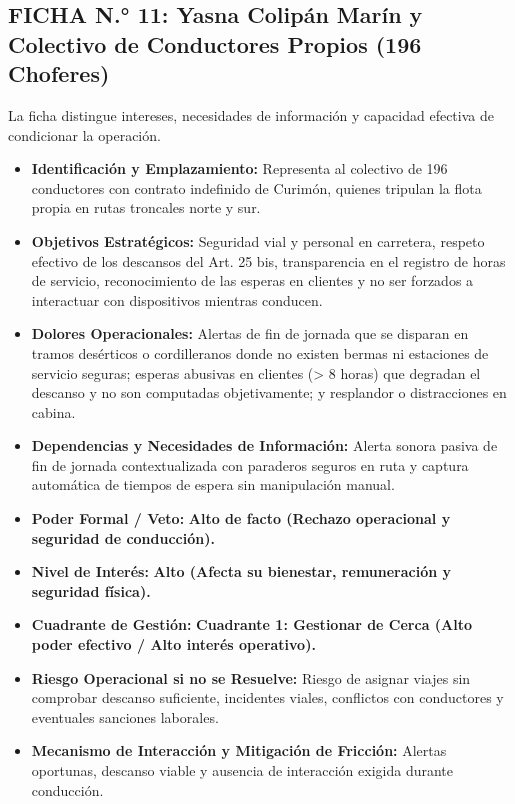 \subsection*{FICHA N.° 11: Yasna Colipán Marín y Colectivo de Conductores Propios (196 Choferes)}
La ficha distingue intereses, necesidades de información y capacidad efectiva de condicionar la operación.
\begin{itemize}
\item \textbf{Identificación y Emplazamiento:} Representa al colectivo de 196 conductores con contrato indefinido de Curimón, quienes tripulan la flota propia en rutas troncales norte y sur.
\item \textbf{Objetivos Estratégicos:} Seguridad vial y personal en carretera, respeto efectivo de los descansos del Art. 25 bis, transparencia en el registro de horas de servicio, reconocimiento de las esperas en clientes y no ser forzados a interactuar con dispositivos mientras conducen.
\item \textbf{Dolores Operacionales:} Alertas de fin de jornada que se disparan en tramos desérticos o cordilleranos donde no existen bermas ni estaciones de servicio seguras; esperas abusivas en clientes (> 8 horas) que degradan el descanso y no son computadas objetivamente; y resplandor o distracciones en cabina.
\item \textbf{Dependencias y Necesidades de Información:} Alerta sonora pasiva de fin de jornada contextualizada con paraderos seguros en ruta y captura automática de tiempos de espera sin manipulación manual.
\item \textbf{Poder Formal / Veto:} \textbf{Alto de facto (Rechazo operacional y seguridad de conducción).}
\item \textbf{Nivel de Interés:} \textbf{Alto (Afecta su bienestar, remuneración y seguridad física).}
\item \textbf{Cuadrante de Gestión:} \textbf{Cuadrante 1: Gestionar de Cerca (Alto poder efectivo / Alto interés operativo).}
\item \textbf{Riesgo Operacional si no se Resuelve:} Riesgo de asignar viajes sin comprobar descanso suficiente, incidentes viales, conflictos con conductores y eventuales sanciones laborales.
\item \textbf{Mecanismo de Interacción y Mitigación de Fricción:} Alertas oportunas, descanso viable y ausencia de interacción exigida durante conducción.
\end{itemize}
